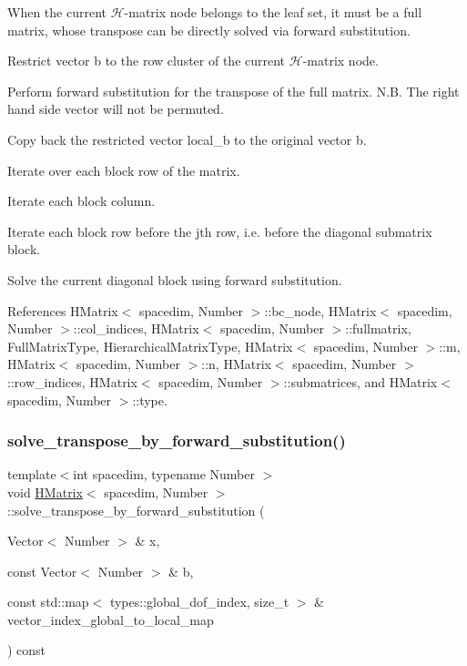 When the current $\mathcal{H}$-\/matrix node belongs to the leaf set, it must be a full matrix, whose transpose can be directly solved via forward substitution.

Restrict vector {\ttfamily b} to the row cluster of the current $\mathcal{H}$-\/matrix node.

Perform forward substitution for the transpose of the full matrix. N.\+B. The right hand side vector will not be permuted.

Copy back the restricted vector {\ttfamily local\+\_\+b} to the original vector {\ttfamily b}.

Iterate over each block row of the matrix.

Iterate each block column.

Iterate each block row before the j\textquotesingle{}th row, i.\+e. before the diagonal submatrix block.

Solve the current diagonal block using forward substitution.

References H\+Matrix$<$ spacedim, Number $>$\+::bc\+\_\+node, H\+Matrix$<$ spacedim, Number $>$\+::col\+\_\+indices, H\+Matrix$<$ spacedim, Number $>$\+::fullmatrix, Full\+Matrix\+Type, Hierarchical\+Matrix\+Type, H\+Matrix$<$ spacedim, Number $>$\+::m, H\+Matrix$<$ spacedim, Number $>$\+::n, H\+Matrix$<$ spacedim, Number $>$\+::row\+\_\+indices, H\+Matrix$<$ spacedim, Number $>$\+::submatrices, and H\+Matrix$<$ spacedim, Number $>$\+::type.

\mbox{\label{classHMatrix_a8e9c993ce276353fda2bfefd0b932670}} 
\subsubsection{\texorpdfstring{solve\+\_\+transpose\+\_\+by\+\_\+forward\+\_\+substitution()}{solve\_transpose\_by\_forward\_substitution()}\hspace{0.1cm}{\footnotesize\ttfamily [4/4]}}
{\footnotesize\ttfamily template$<$int spacedim, typename Number $>$ \\
void \hyperlink{classHMatrix}{H\+Matrix}$<$ spacedim, Number $>$\+::solve\+\_\+transpose\+\_\+by\+\_\+forward\+\_\+substitution (\begin{DoxyParamCaption}\item[{Vector$<$ Number $>$ \&}]{x,  }\item[{const Vector$<$ Number $>$ \&}]{b,  }\item[{const std\+::map$<$ types\+::global\+\_\+dof\+\_\+index, size\+\_\+t $>$ \&}]{vector\+\_\+index\+\_\+global\+\_\+to\+\_\+local\+\_\+map }\end{DoxyParamCaption}) const}


